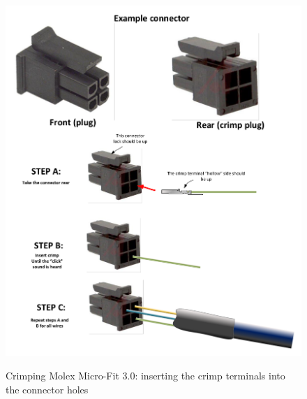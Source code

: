 \begin{figure}
  \centering
  \includegraphics[angle=90,width=1\columnwidth]{figs/body03/FIGCRIMP4.pdf}\\
  \caption[Crimping Molex Micro-Fit 3.0\texttrademark: inserting the crimp terminals into the connector holes]{Crimping Molex Micro-Fit 3.0\texttrademark: inserting the crimp terminals into the connector holes}
  \label{FIG:CRIMP4}
\end{figure}
